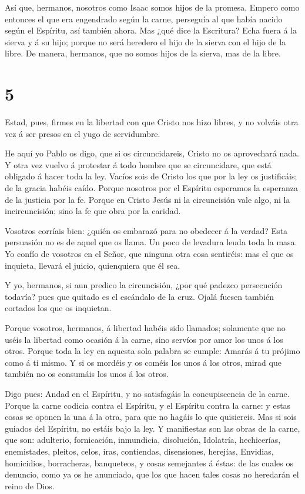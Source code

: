  Así que, hermanos, nosotros como Isaac somos hijos de la
promesa.  Empero como entonces el que era engendrado según
la carne, perseguía al que había nacido según el Espíritu, así también
ahora.  Mas ¿qué dice la Escritura? Echa fuera á la sierva
y á su hijo; porque no será heredero el hijo de la sierva con el hijo de
la libre.  De manera, hermanos, que no somos hijos de la
sierva, mas de la libre.

\hypertarget{section-4}{%
\section{5}\label{section-4}}

 Estad, pues, firmes en la libertad con que Cristo nos hizo
libres, y no volváis otra vez á ser presos en el yugo de servidumbre.

 He aquí yo Pablo os digo, que si os circuncidareis, Cristo
no os aprovechará nada.  Y otra vez vuelvo á protestar á
todo hombre que se circuncidare, que está obligado á hacer toda la ley.
 Vacíos sois de Cristo los que por la ley os justificáis; de
la gracia habéis caído.  Porque nosotros por el Espíritu
esperamos la esperanza de la justicia por la fe.  Porque en
Cristo Jesús ni la circuncisión vale algo, ni la incircuncisión; sino la
fe que obra por la caridad.

 Vosotros corríais bien: ¿quién os embarazó para no obedecer
á la verdad?  Esta persuasión no es de aquel que os llama.
 Un poco de levadura leuda toda la masa.  Yo
confío de vosotros en el Señor, que ninguna otra cosa sentiréis: mas el
que os inquieta, llevará el juicio, quienquiera que él sea.

 Y yo, hermanos, si aun predico la circuncisión, ¿por qué
padezco persecución todavía? pues que quitado es el escándalo de la
cruz.  Ojalá fuesen también cortados los que os inquietan.

 Porque vosotros, hermanos, á libertad habéis sido
llamados; solamente que no uséis la libertad como ocasión á la carne,
sino servíos por amor los unos á los otros.  Porque toda la
ley en aquesta sola palabra se cumple: Amarás á tu prójimo como á ti
mismo.  Y si os mordéis y os coméis los unos á los otros,
mirad que también no os consumáis los unos á los otros.

 Digo pues: Andad en el Espíritu, y no satisfagáis la
concupiscencia de la carne.  Porque la carne codicia contra
el Espíritu, y el Espíritu contra la carne: y estas cosas se oponen la
una á la otra, para que no hagáis lo que quisiereis.  Mas
si sois guiados del Espíritu, no estáis bajo la ley.  Y
manifiestas son las obras de la carne, que son: adulterio, fornicación,
inmundicia, disolución,  Idolatría, hechicerías,
enemistades, pleitos, celos, iras, contiendas, disensiones, herejías,
 Envidias, homicidios, borracheras, banqueteos, y cosas
semejantes á éstas: de las cuales os denuncio, como ya os he anunciado,
que los que hacen tales cosas no heredarán el reino de Dios.

